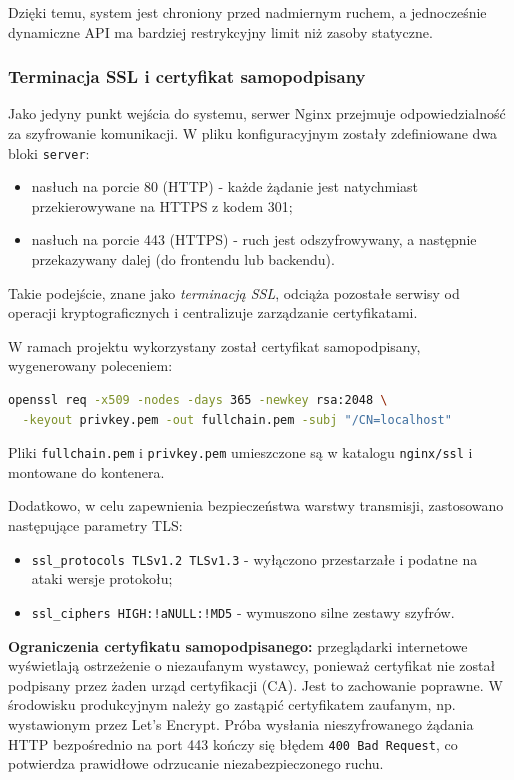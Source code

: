\documentclass[12pt,a4paper]{article}
\begin{document}
Dzięki temu, system jest chroniony przed nadmiernym ruchem, a jednocześnie dynamiczne API ma bardziej restrykcyjny limit niż zasoby statyczne. 

\subsubsection{Terminacja SSL i certyfikat samopodpisany}
Jako jedyny punkt wejścia do systemu, serwer Nginx przejmuje odpowiedzialność za szyfrowanie komunikacji. W pliku konfiguracyjnym zostały zdefiniowane dwa bloki \texttt{server}:
\begin{itemize}
    \item nasłuch na porcie 80 (HTTP) - każde żądanie jest natychmiast przekierowywane na HTTPS z kodem 301;
    \item nasłuch na porcie 443 (HTTPS) - ruch jest odszyfrowywany, a następnie przekazywany dalej (do frontendu lub backendu).
\end{itemize}
Takie podejście, znane jako \textit{terminacją SSL}, odciąża pozostałe serwisy od operacji kryptograficznych i centralizuje zarządzanie certyfikatami.

W ramach projektu wykorzystany został certyfikat samopodpisany, wygenerowany poleceniem:
\begin{lstlisting}[language=bash]
openssl req -x509 -nodes -days 365 -newkey rsa:2048 \
  -keyout privkey.pem -out fullchain.pem -subj "/CN=localhost"
\end{lstlisting}
Pliki \texttt{fullchain.pem} i \texttt{privkey.pem} umieszczone są w katalogu \texttt{nginx/ssl} i montowane do kontenera.

Dodatkowo, w celu zapewnienia bezpieczeństwa warstwy transmisji, zastosowano następujące parametry TLS:
\begin{itemize}
    \item \texttt{ssl\_protocols TLSv1.2 TLSv1.3} - wyłączono przestarzałe i podatne na ataki wersje protokołu;
    \item \texttt{ssl\_ciphers HIGH:!aNULL:!MD5} - wymuszono silne zestawy szyfrów.
\end{itemize}

\textbf{Ograniczenia certyfikatu samopodpisanego:} przeglądarki internetowe wyświetlają ostrzeżenie o niezaufanym wystawcy, ponieważ certyfikat nie został podpisany przez żaden urząd certyfikacji (CA). Jest to zachowanie poprawne. W środowisku produkcyjnym należy go zastąpić certyfikatem zaufanym, np. wystawionym przez Let's Encrypt. Próba wysłania nieszyfrowanego żądania HTTP bezpośrednio na port 443 kończy się błędem \texttt{400 Bad Request}, co potwierdza prawidłowe odrzucanie niezabezpieczonego ruchu.
\end{document}
